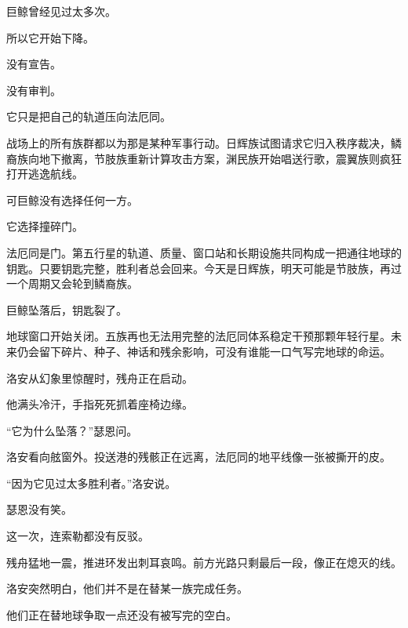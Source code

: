 巨鲸曾经见过太多次。

所以它开始下降。

没有宣告。

没有审判。

它只是把自己的轨道压向法厄同。

战场上的所有族群都以为那是某种军事行动。日辉族试图请求它归入秩序裁决，鳞裔族向地下撤离，节肢族重新计算攻击方案，渊民族开始唱送行歌，震翼族则疯狂打开逃逸航线。

可巨鲸没有选择任何一方。

它选择撞碎门。

法厄同是门。第五行星的轨道、质量、窗口站和长期设施共同构成一把通往地球的钥匙。只要钥匙完整，胜利者总会回来。今天是日辉族，明天可能是节肢族，再过一个周期又会轮到鳞裔族。

巨鲸坠落后，钥匙裂了。

地球窗口开始关闭。五族再也无法用完整的法厄同体系稳定干预那颗年轻行星。未来仍会留下碎片、种子、神话和残余影响，可没有谁能一口气写完地球的命运。

洛安从幻象里惊醒时，残舟正在启动。

他满头冷汗，手指死死抓着座椅边缘。

“它为什么坠落？”瑟恩问。

洛安看向舷窗外。投送港的残骸正在远离，法厄同的地平线像一张被撕开的皮。

“因为它见过太多胜利者。”洛安说。

瑟恩没有笑。

这一次，连索勒都没有反驳。

残舟猛地一震，推进环发出刺耳哀鸣。前方光路只剩最后一段，像正在熄灭的线。

洛安突然明白，他们并不是在替某一族完成任务。

他们正在替地球争取一点还没有被写完的空白。
